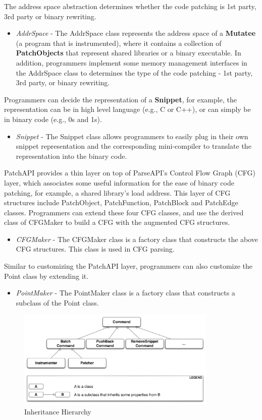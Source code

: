 The address space abstraction determines whether the code patching is 1st party,
3rd party or binary rewriting.
\begin{itemize}
\item \emph{AddrSpace} - The AddrSpace class represents the address space of a
  \textbf{Mutatee} (a program that is instrumented), where it contains a
  collection of \textbf{PatchObjects} that represent shared libraries or a
  binary executable. In addition, programmers implement some memory management
  interfaces in the AddrSpace class to determines the type of the code patching
  - 1st party, 3rd party, or binary rewriting.
\end{itemize}
Programmers can decide the representation of a \textbf{Snippet}, for example, the
representation can be in high level language (e.g., C or C++), or can simply be
in binary code (e.g., 0s and 1s).
\begin{itemize}
\item \emph{Snippet} - The Snippet class allows programmers to easily plug in
  their own snippet representation and the corresponding mini-compiler to
  translate the representation into the binary code.
\end{itemize}
PatchAPI provides a thin layer on top of ParseAPI's Control Flow Graph (CFG)
layer, which associates some useful information for the ease of binary code
patching, for example, a shared library's load address. This layer of CFG
structures include PatchObject, PatchFunction, PatchBlock and PatchEdge classes.
Programmers can extend these four CFG classes, and use the derived class of
CFGMaker to build a CFG with the augmented CFG structures.

\begin{itemize}
\item \emph{CFGMaker} - The CFGMaker class is a factory class that constructs the above
    CFG structures. This class is used in CFG parsing.
\end{itemize}

Similar to customizing the PatchAPI layer, programmers can also customize the
Point class by extending it.
\begin{itemize}
\item \emph{PointMaker} - The PointMaker class is a factory class that
  constructs a subclass of the Point class.
\end{itemize}


\begin{figure}[ht!]
\centerline{\includegraphics[width=0.85\textwidth]{./figure/command/img.pdf}}
\caption{\label{fig:inh}Inheritance Hierarchy}
\end{figure}

